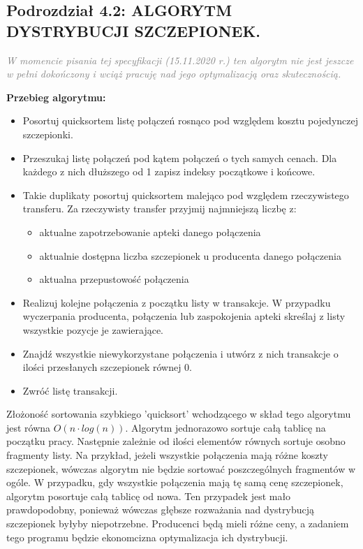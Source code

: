 \documentclass[a4paper]{article}
\begin{document}
\subsection*{Podrozdział 4.2: ALGORYTM DYSTRYBUCJI SZCZEPIONEK.}
\begin{flushleft}
\emph{
\textcolor{gray}{W momencie pisania tej specyfikacji (15.11.2020 r.) ten algorytm nie jest jeszcze w pełni dokończony i wciąż pracuję nad jego optymalizacją oraz skutecznością.}
}
\end{flushleft}
\textbf{Przebieg algorytmu:}
\begin{itemize}
	\item Posortuj quicksortem listę połączeń rosnąco pod względem kosztu pojedynczej szczepionki.
	\item Przeszukaj listę połączeń pod kątem połączeń o tych samych cenach. Dla każdego z nich dłuższego od 1 zapisz indeksy początkowe i końcowe.
	\item Takie duplikaty posortuj quicksortem malejąco pod względem rzeczywistego transferu. Za rzeczywisty transfer przyjmij najmniejszą liczbę z: 
	\begin{itemize}
			\item aktualne zapotrzebowanie apteki danego połączenia
			\item aktualnie dostępna liczba szczepionek u producenta danego połączenia
			\item aktualna przepustowość połączenia
	\end{itemize}
	\item Realizuj kolejne połączenia z początku listy w transakcje. W przypadku wyczerpania producenta, połączenia lub zaspokojenia apteki skreślaj z listy wszystkie pozycje je zawierające.
	\item Znajdź wszystkie niewykorzystane połączenia i utwórz z nich transakcje o ilości przesłanych szczepionek równej 0.
	\item Zwróć listę transakcji.
\end{itemize}
Złożoność sortowania szybkiego 'quicksort' wchodzącego w skład tego algorytmu jest równa $O(n\cdot log(n))$. Algorytm jednorazowo sortuje całą tablicę na początku pracy. Następnie zależnie od ilości elementów równych sortuje osobno fragmenty listy. Na przykład, jeżeli wszystkie połączenia mają różne koszty szczepionek, wówczas algorytm nie będzie sortować poszczególnych fragmentów w ogóle. W przypadku, gdy wszystkie połączenia mają tę samą cenę szczepionek, algorytm posortuje całą tablicę od nowa. Ten przypadek jest mało prawdopodobny, ponieważ wówczas głębsze rozważania nad dystrybucją szczepionek byłyby niepotrzebne. Producenci będą mieli różne ceny, a zadaniem tego programu będzie ekonomcizna optymalizacja ich dystrybucji. 
\end{document}
